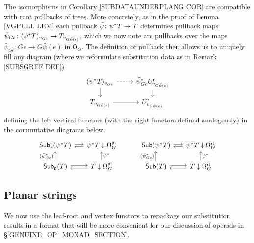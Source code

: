 \documentclass[a4paper,10pt]{article}%
\begin{document}
\begin{remark}\label{PULLCOMP REM}
	The isomorphisms in Corollary \ref{SUBDATAUNDERPLANG COR}
	are compatible with root pullbacks of trees. 
	More concretely, as in the proof of Lemma \ref{VGPULL LEM}
	each pullback 
	$\bar{\psi} \colon \psi^{\**} T \to T$
	determines pullback maps
	$\bar{\psi}_{G e} \colon
	(\psi^{\**} T)_{v_{Ge}} \to T_{v_{G \bar{\psi}(e)}}$,
	which we now note are pullbacks over the maps
	$\bar{\psi}_{G e} \colon Ge \to G \bar{\psi}(e)$
	in $\mathsf{O}_G$. The definition of pullback then allows us to uniquely fill any diagram (where we reformulate substitution data as in Remark \ref{SUBSGREF DEF})
\[
\begin{tikzcd}[row sep =10pt]
	(\psi^{\**} T)_{v_{Ge}} \ar{d} \ar[dashed]{r} &
	\bar{\psi}_{G e}^{\**}U_{v_{G \bar{\psi}(e)}}^{\mathsf{r}} \ar{d}
\\
	T_{v_{G \bar{\psi}(e)}} \ar{r} &
	U_{v_{G \bar{\psi}(e)}}^{\mathsf{r}}
\end{tikzcd}	
\]
defining the left vertical functors (with the right functors defined analogously) in the commutative diagrams below.
\begin{equation}\label{SUBDATAUNDERPLANG2 EQ}
\begin{tikzcd}[row sep =12pt,column sep= 14pt]
	\mathsf{Sub}_{\mathsf{p}}(\psi^{\**} T) \ar[r,shift left=2pt] &
	\psi^{\**} T \downarrow \Omega_{G}^{\mathsf{pt}} \ar[l,shift left=2pt] & &
	\mathsf{Sub}(\psi^{\**} T) \ar[r,shift left=2pt] &
	\psi^{\**} T \downarrow \Omega_{G}^{\mathsf{rt}} \ar[l,shift left=2pt]
\\
	\mathsf{Sub}_{\mathsf{p}}(T) \ar[r,shift left=2pt] \ar{u}{(\bar{\psi}_{Ge}^{\**})} &
	T \downarrow \Omega_{G}^{\mathsf{pt}} \ar[l,shift left=2pt] \ar{u}[swap]{\psi^{\**}} & &
	\mathsf{Sub}(T) \ar[r,shift left=2pt] \ar{u}{(\bar{\psi}_{Ge}^{\**})} &
	T \downarrow \Omega_{G}^{\mathsf{rt}} \ar[l,shift left=2pt] \ar{u}[swap]{\psi^{\**}}
\end{tikzcd}
\end{equation}
\end{remark}


\subsection{Planar strings}\label{PLANARSTRING SEC}

We now use the leaf-root and vertex functors to repackage 
our substitution results in a format that will be more convenient for our discussion of operads in 
\S \ref{GENUINE_OP_MONAD_SECTION}.
\end{document}

